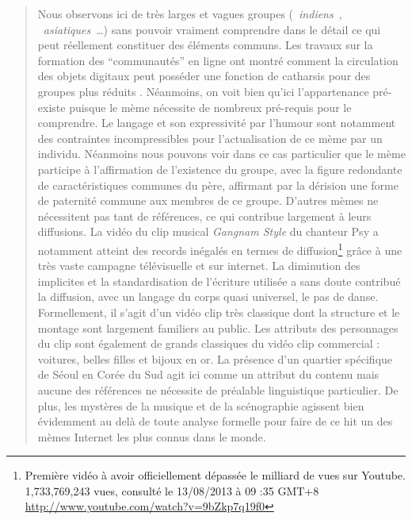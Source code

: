\begin{quote}
Nous observons ici de tr\`es larges et vagues groupes ({\guillemotleft}~\textit{indiens}~{\guillemotright}, {\guillemotleft}~\textit{asiatiques}~{\guillemotright}{\dots}) sans pouvoir vraiment comprendre dans le d\'etail ce qui peut r\'eellement constituer des \'el\'ements communs. Les travaux sur la formation des {\textquotedblleft}communaut\'es{\textquotedblright} en ligne ont montr\'e comment la circulation des objets digitaux peut poss\'eder une fonction de catharsis pour des groupes plus r\'eduits \cite{Steyer2006}. N\'eanmoins, on voit bien qu{\textquoteright}ici l{\textquoteright}appartenance pr\'e-existe puisque le m\`eme n\'ecessite de nombreux pr\'e-requis pour le comprendre. Le langage et son expressivit\'e par l{\textquoteright}humour sont notamment des contraintes incompressibles pour l{\textquoteright}actualisation de ce m\`eme par un individu. N\'eanmoins nous pouvons voir dans ce cas particulier que le m\`eme participe \`a l{\textquoteright}affirmation de l{\textquoteright}existence du groupe, avec la figure redondante de caract\'eristiques communes du p\`ere, affirmant par la d\'erision une forme de paternit\'e commune aux membres de ce groupe. D{\textquoteright}autres m\`emes ne n\'ecessitent pas tant de r\'ef\'erences, ce qui contribue largement \`a leurs diffusions. La vid\'eo du clip musical \textit{Gangnam Style} du chanteur Psy a notamment atteint des records in\'egal\'es en termes de diffusion\footnote{ Premi\`ere vid\'eo \`a avoir officiellement d\'epass\'ee le milliard de vues sur Youtube. 1,733,769,243 vues, consult\'e le 13/08/2013 \`a 09 :35 GMT+8 \url{http://www.youtube.com/watch?v=9bZkp7q19f0}} gr\^ace \`a une tr\`es vaste campagne t\'el\'evisuelle et sur internet. La diminution des implicites et la standardisation de l{\textquoteright}\'ecriture utilis\'ee a sans doute contribu\'e la diffusion, avec un langage du corps quasi universel, le pas de danse. Formellement, il s{\textquoteright}agit d{\textquoteright}un vid\'eo clip tr\`es classique dont la structure et le montage sont largement familiers au public. Les attributs des personnages du clip sont \'egalement de grands classiques du vid\'eo clip commercial : voitures, belles filles et bijoux en or. La pr\'esence d{\textquoteright}un quartier sp\'ecifique de S\'eoul en Cor\'ee du Sud agit ici comme un attribut du contenu mais aucune des r\'ef\'erences ne n\'ecessite de pr\'ealable linguistique particulier. De plus, les myst\`eres de la musique et de la sc\'enographie agissent bien \'evidemment au del\`a de toute analyse formelle pour faire de ce hit un des m\`emes Internet les plus connus dans le monde. 

\end{quote}
